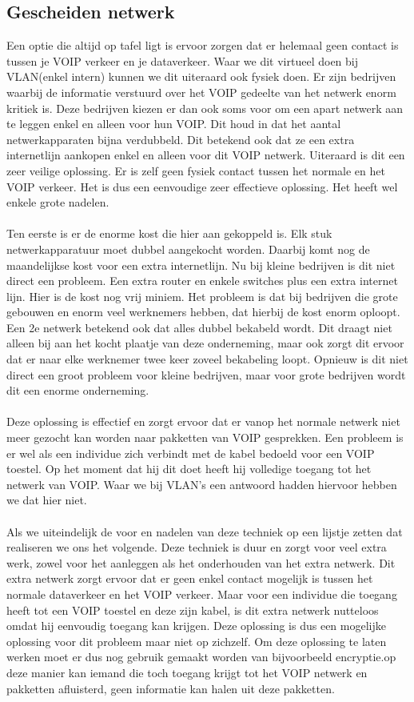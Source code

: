 \documentclass[pdftex,a4paper,12pt,twoside]{report}
\begin{document}
\subsection{Gescheiden netwerk}
Een optie die altijd op tafel ligt is ervoor zorgen dat er helemaal geen contact is tussen je VOIP verkeer en je dataverkeer. Waar we dit virtueel doen bij VLAN(enkel intern) kunnen we dit uiteraard ook fysiek doen. Er zijn bedrijven waarbij de informatie verstuurd over het VOIP gedeelte van het netwerk enorm kritiek is. Deze bedrijven kiezen er dan ook soms voor om een apart netwerk aan te leggen enkel en alleen voor hun VOIP. Dit houd in dat het aantal netwerkapparaten bijna verdubbeld. Dit betekend ook dat ze een extra internetlijn aankopen enkel en alleen voor dit VOIP netwerk. Uiteraard is dit een zeer veilige oplossing. Er is zelf geen fysiek contact tussen het normale en het VOIP verkeer. Het is dus een eenvoudige zeer effectieve oplossing. Het heeft wel enkele grote nadelen.
\\ \\
Ten eerste is er de enorme kost die hier aan gekoppeld is. Elk stuk netwerkapparatuur moet dubbel aangekocht worden. Daarbij komt nog de maandelijkse kost voor een extra internetlijn. Nu bij kleine bedrijven is dit niet direct een probleem. Een extra router en enkele switches plus een extra internet lijn. Hier is de kost nog vrij miniem. Het probleem is dat bij bedrijven die grote gebouwen en enorm veel werknemers hebben, dat hierbij de kost enorm oploopt.\\
Een 2e netwerk betekend ook dat alles dubbel bekabeld wordt. Dit draagt niet alleen bij aan het kocht plaatje van deze onderneming, maar ook zorgt dit ervoor dat er naar elke werknemer twee keer zoveel bekabeling loopt. Opnieuw is dit niet direct een groot probleem voor kleine bedrijven, maar voor grote bedrijven wordt dit een enorme onderneming. 
\\ \\
Deze oplossing is effectief en zorgt ervoor dat er vanop het normale netwerk niet meer gezocht kan worden naar pakketten van VOIP gesprekken. Een probleem is er wel als een individue zich verbindt met de kabel bedoeld voor een VOIP toestel. Op het moment dat hij dit doet heeft hij volledige toegang tot het netwerk van VOIP. Waar we bij VLAN's een antwoord hadden hiervoor hebben we dat hier niet. 
\\ \\
Als we uiteindelijk de voor en nadelen van deze techniek op een lijstje zetten dat realiseren we ons het volgende. Deze techniek is duur en zorgt voor veel extra werk, zowel voor het aanleggen als het onderhouden van het extra netwerk. Dit extra netwerk zorgt ervoor dat er geen enkel contact mogelijk is tussen het normale dataverkeer en het VOIP verkeer. Maar voor een individue die toegang heeft tot een VOIP toestel en deze zijn kabel, is dit extra netwerk nutteloos omdat hij eenvoudig toegang kan krijgen. Deze oplossing is dus een mogelijke oplossing voor dit probleem maar niet op zichzelf. Om deze oplossing te laten werken moet er dus nog gebruik gemaakt worden van bijvoorbeeld encryptie.op deze manier kan iemand die toch toegang krijgt tot het VOIP netwerk en pakketten afluisterd, geen informatie kan halen uit deze pakketten.
\end{document}
